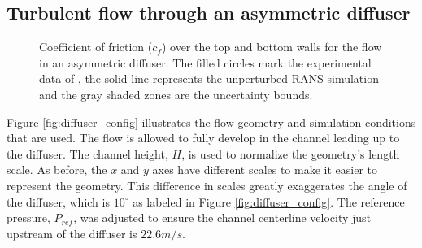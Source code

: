 \subsection{Turbulent flow through an asymmetric diffuser}

\begin{figure}
\centering
{}
\caption{Coefficient of friction ($c_f$) over the top and bottom walls for the flow in an asymmetric diffuser. The filled circles mark the experimental data of \cite{buice}, the solid line represents the unperturbed RANS simulation and the gray shaded zones are the uncertainty bounds.\label{fig:diffuser_cf}}
\end{figure}

Figure \ref{fig:diffuser_config} illustrates the flow geometry and simulation conditions that are used. The flow is allowed to fully develop in the channel leading up to the diffuser. The channel height, $H$, is used to normalize the geometry's length scale. As before, the $x$ and $y$ axes have different scales to make it easier to represent the geometry. This difference in scales greatly exaggerates the angle of the diffuser, which is $10^\circ$ as labeled in Figure \ref{fig:diffuser_config}. The reference pressure, $P_{ref}$, was adjusted to ensure the channel centerline velocity just upstream of the diffuser is $22.6 m/s$. 

